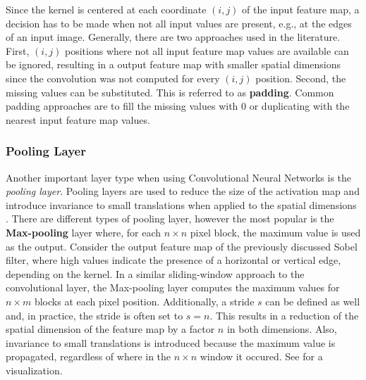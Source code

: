 

Since the kernel is centered at each coordinate $(i,j)$ of the input feature map, a decision has to be made when not all input values are present, e.g., at the edges of an input image.
Generally, there are two approaches used in the literature.
First, $(i,j)$ positions where not all input feature map values are available can be ignored, resulting in a output feature map with smaller spatial dimensions since the convolution was not computed for every $(i,j)$ position.
Second, the missing values can be substituted.
This is referred to as \textbf{padding}.
Common padding approaches are to fill the missing values with $0$ or duplicating with the nearest input feature map values.

\subsubsection{Pooling Layer}
Another important layer type when using Convolutional Neural Networks is the \textit{pooling layer}.
Pooling layers are used to reduce the size of the activation map and introduce invariance to small translations when applied to the spatial dimensions \cite{goodfellow_deep_2016}.
There are different types of pooling layer, however the most popular is the \textbf{Max-pooling} layer where, for each $n \times n$ pixel block, the maximum value is used as the output.
Consider the output feature map of the previously discussed Sobel filter, where high values indicate the presence of a horizontal or vertical edge, depending on the kernel.
In a similar sliding-window approach to the convolutional layer, the Max-pooling layer computes the maximum values for $n \times m$ blocks at each pixel position.
Additionally, a stride $s$ can be defined as well and, in practice, the stride is often set to $s=n$.
This results in a reduction of the spatial dimension of the feature map by a factor $n$ in both dimensions.
Also, invariance to small translations is introduced because the maximum value is propagated, regardless of where in the $n \times n$ window it occured. 
See  for a visualization.

